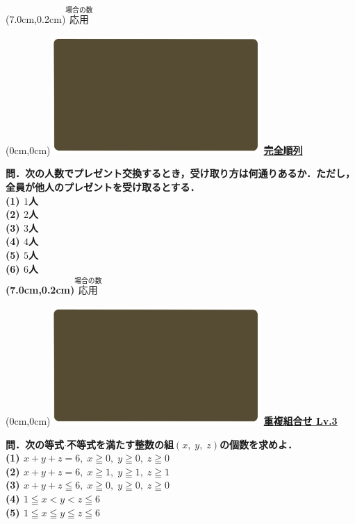 \documentclass[10pt,
fleqn,
dvipdfmx,
uplatex
]{jsarticle}
\begin{document}
\at(7.0cm,0.2cm){\small\color{bradorange}$\overset{\text{場合の数}}{\text{応用}}$}


\newpage



\at(0cm,0cm){\includegraphics[width=8cm,bb=0 0 1920 1080]{./youtube/thumbnails/templates/smart_background/場合の数.jpeg}}
{\color{orange}\bf\boldmath\huge\underline{完全順列}}\vspace{0.3zw}

\normalsize 
\bf\boldmath 問．次の人数でプレゼント交換するとき，受け取り方は何通りあるか．ただし，全員が他人のプレゼントを受け取るとする．\\
(1)  $1$人\\
(2)  $2$人\\
(3)  $3$人\\
(4)  $4$人\\
(5)  $5$人\\
(6)  $6$人\\

\at(7.0cm,0.2cm){\small\color{bradorange}$\overset{\text{場合の数}}{\text{応用}}$}


\newpage



\at(0cm,0cm){\includegraphics[width=8cm,bb=0 0 1920 1080]{./youtube/thumbnails/templates/smart_background/場合の数.jpeg}}
{\color{orange}\bf\boldmath\huge\underline{重複組合せ Lv.3 }}\vspace{0.3zw}

\normalsize 
\bf\boldmath 問．次の等式$\cdot$不等式を満たす整数の組$\left(x,\;y,\;z\right)$の個数を求めよ．\\
(1)  $x+y+z=6,\;x\geqq 0,\;y\geqq 0,\;z\geqq 0$\\
(2)  $x+y+z=6,\;x\geqq 1,\;y\geqq 1,\;z\geqq 1$\\
(3)  $x+y+z\leqq 6,\;x\geqq 0,\;y\geqq 0,\;z\geqq 0$\\
(4)  $1\leqq x<y<z\leqq 6$\\
(5)  $1\leqq x\leqq y\leqq z\leqq 6$\\
\end{document}
